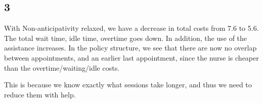 \documentclass{report}
\begin{document}
\newpage
\subsection{3}
With Non-anticipativity relaxed, we have a decrease in total costs from 7.6 to 5.6. The total wait time, idle time, overtime goes down. In addition, the use of the assistance increases. In the policy structure, we see that there are now no overlap between appointments, and an earlier last appointment, since the nurse is cheaper than the overtime/waiting/idle costs. 

This is because we know exactly what sessions take longer, and thus we need to reduce them with help. 
\end{document}
